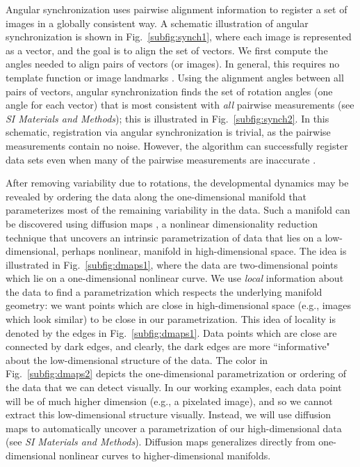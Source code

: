\documentclass{pnastwo}
\newcommand{\SI}[0]{{\it SI Materials and Methods}}
\newcommand{\fig}[0]{Fig.}
\begin{document}
\begin{article}
Angular synchronization uses pairwise alignment information to register a set of images in a globally consistent way.
%
A schematic illustration of angular synchronization is shown in \fig~\ref{subfig:synch1}, where each image is represented as a vector, and the goal is to align the set of vectors.
%
We first compute the angles needed to align pairs of vectors (or images).  
%
In general, this requires no template function \cite{ahuja2007template} or image landmarks \cite{ian1998statistical}.
%
Using the alignment angles between all pairs of vectors, angular synchronization finds the set of rotation angles (one angle for each vector) that is most consistent with {\it all} pairwise measurements (see \SI); this is illustrated in \fig~\ref{subfig:synch2}.
%
In this schematic, registration via angular synchronization is trivial, as the pairwise measurements contain no noise.
%
However, the algorithm can successfully register data sets even when many of the pairwise measurements are inaccurate \cite{singer2011angular}.


After removing variability due to rotations, the developmental dynamics may be revealed by ordering the data along the one-dimensional manifold that parameterizes most of the remaining variability in the data.
%
Such a manifold can be discovered using diffusion maps \cite{coifman2005geometric}, a nonlinear dimensionality reduction technique that uncovers an intrinsic parametrization of data that lies on a low-dimensional, perhaps nonlinear, manifold in high-dimensional space.
%
The idea is illustrated in \fig~\ref{subfig:dmaps1}, where the data are two-dimensional points which lie on a one-dimensional nonlinear curve.
%
We use {\it local} information about the data to find a parametrization  which respects the underlying manifold geometry: we want points which are close in high-dimensional space (e.g., images which look similar) to be close in our parametrization.
%
This idea of locality is denoted by the edges in \fig~\ref{subfig:dmaps1}.
%
Data points which are close are connected by dark edges, and clearly, the dark edges are more ``informative" about the low-dimensional structure of the data.
%
The color in \fig~\ref{subfig:dmaps2} depicts the one-dimensional parametrization or ordering of the data that we can detect visually.
%
In our working examples, each data point will be of much higher dimension (e.g., a pixelated image), and so we cannot extract this low-dimensional structure visually.
%
Instead, we will use diffusion maps to automatically uncover a parametrization of our high-dimensional data (see \SI).
%
Diffusion maps generalizes directly from one-dimensional nonlinear curves to higher-dimensional manifolds.


\end{article}
\end{document}
